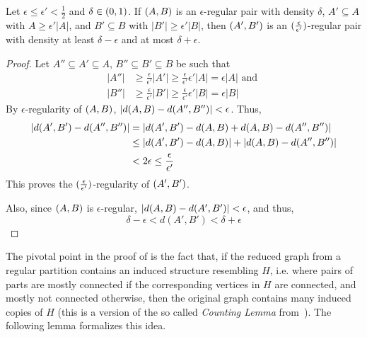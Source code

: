         \begin{lemma} \label{lem:regularity_is_transitive}
            Let $\epsilon \leq \epsilon' < \frac{1}{2}$ and $\delta \in ( 0, 1 )$.
            If $( A,B )$ is an $\epsilon$-regular pair with density $\delta$, $A' \subseteq A$ with $A \geq \epsilon' |A|$, and
            $B' \subseteq B$ with $|B'| \geq \epsilon' |B|$, then $( A', B' )$ is an $( \frac{\epsilon}{\epsilon'} )$-regular
            pair with density at least $\delta - \epsilon$ and at most $\delta + \epsilon$.
            \begin{proof}
                Let $A'' \subseteq A' \subseteq A$, $B'' \subseteq B' \subseteq B$ be such that
                \begin{align*}
                    |A''| & \geq \frac{\epsilon}{\epsilon'} |A'| \geq \frac{\epsilon}{\epsilon'} \epsilon' |A| = \epsilon |A|
                    \text{ and } \\
                    |B''| & \geq \frac{\epsilon}{\epsilon'} |B'| \geq \frac{\epsilon}{\epsilon'} \epsilon' |B| = \epsilon |B|
                \end{align*}
                By $\epsilon$-regularity of $( A,B )$, $| d(A,B) - d(A'',B'') | < \epsilon$.
                Thus,
                \begin{align*}
                    | d(A',B') - d(A'',B'') |
                        & = | d(A',B') - d(A,B) + d(A,B) - d(A'',B'') | \\
                        & \leq | d(A',B') - d(A,B) | + | d(A,B) - d(A'',B'') | \\
                        & < 2 \epsilon \leq \frac{\epsilon}{\epsilon'}
                \end{align*}
                This proves the $( \frac{\epsilon}{\epsilon'} )$-regularity of $( A',B' )$.

                Also, since $( A,B )$ is $\epsilon$-regular, $| d(A,B) - d(A',B') | < \epsilon$,
                and thus,
                \[
                    \delta - \epsilon < d(A',B') < \delta + \epsilon
                \]
            \end{proof}
        \end{lemma}

        The pivotal point in the proof of  is the fact that, if the
        reduced graph  from a regular partition contains an induced structure resembling $H$, i.e. where pairs of parts are
        mostly connected if the corresponding vertices in $H$ are connected, and mostly not connected otherwise,
        then the original graph contains many induced copies of $H$ (this is a version of the so called \emph{Counting Lemma}
        from~\cite{the_regulariy_lemma_and_its_applications_in_graph_theory}).
        The following lemma formalizes this idea.

